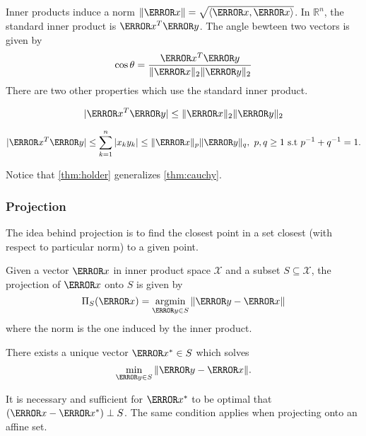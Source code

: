 Inner products induce a norm $\norm{\V{x}} = \sqrt{\langle \V{x}, \V{x} \rangle}$.
In $\mathbb{R}^n$, the standard inner product is $\V{x}^T\V{y}$.
The angle bewteen two vectors is given by
\[
  \cos\theta = \frac{\V{x}^T\V{y}}{\norm{\V{x}}_2\norm{\V{y}}_2}
\]
There are two other properties which use the standard inner product.
\begin{theorem}
  \[
	|\V{x}^T\V{y}| \leq \norm{\V{x}}_2\norm{\V{y}}_2
  \]
  \label{thm:cauchy}
\end{theorem}
\begin{theorem}
  \[
	|\V{x}^T\V{y}| \leq \sum_{k=1}^n |x_ky_k| \leq \norm{\V{x}}_p\norm{\V{y}}_q,\ p, q\geq 1 \text{ s.t } p^{-1}+q^{-1}=1.
  \]
  \label{thm:holder}
\end{theorem}
Notice that \cref{thm:holder} generalizes \cref{thm:cauchy}.
\subsubsection{Projection}
The idea behind projection is to find the closest point in a set closest (with respect to particular norm) to a given point.
\begin{definition}
  Given a vector $\V{x}$ in inner product space $\mathcal{X}$ and a subset $S\subseteq\mathcal{X}$, the projection of $\V{x}$ onto $S$ is given by
  \[
	\Pi_S(\V{x}) = \argmin_{\V{y}\in S}\norm{\V{y}-\V{x}}
  \]
  where the norm is the one induced by the inner product.
  \label{defn:projection}
\end{definition}
\begin{theorem}
  There exists a unique vector $\V{x}^*\in S$ which solves
  \[
	\min_{\V{y}\in S} \norm{\V{y}-\V{x}}.
  \]
  \label{thm:projection}
\end{theorem}
It is necessary and sufficient for $\V{x}^*$ to be optimal that $(\V{x}-\V{x}^*)\perp S$.
The same condition applies when projecting onto an affine set.
